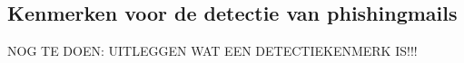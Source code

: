 \subsection{Kenmerken voor de detectie van phishingmails}
\label{subsec:Kenmerken voor de detectie van phishingmails}
NOG TE DOEN: UITLEGGEN WAT EEN DETECTIEKENMERK IS!!!




